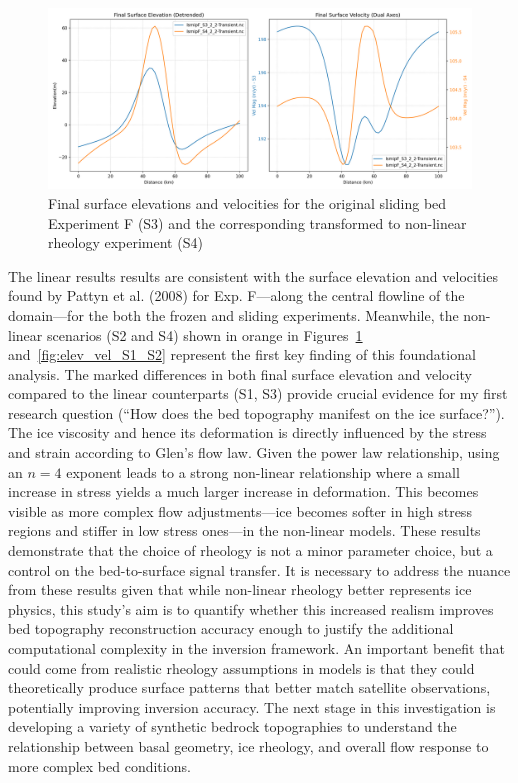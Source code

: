 \begin{figure}[H]
    \includegraphics[scale=0.40]{figures/combined_elevation_detrended_surface_velocity_['S3']_['S4'].png}
    \caption{Final surface elevations and velocities for the original sliding bed Experiment F (S3) and the corresponding transformed to non-linear rheology experiment (S4)}
    \label{fig:elev_vel_S3_S4}
\end{figure}
The linear results results are consistent with the surface elevation and velocities found by Pattyn et al. (2008) for Exp. F—along the central flowline of the domain—for the both the frozen and sliding experiments. Meanwhile, the non-linear scenarios (S2 and S4) shown in orange in Figures~\ref{fig:elev_vel_S3_S4} and~\ref{fig:elev_vel_S1_S2} represent the first key finding of this foundational analysis. The marked differences in both final surface elevation and velocity compared to the linear counterparts (S1, S3) provide crucial evidence for my first research question (``How does the bed topography manifest on the ice surface?''). The ice viscosity and hence its deformation is directly influenced by the stress and strain according to Glen's flow law. Given the power law relationship, using an $n = 4$ exponent leads to a strong non-linear relationship where a small increase in stress yields a much larger increase in deformation. This becomes visible as more complex flow adjustments—ice becomes softer in high stress regions and stiffer in low stress ones—in the non-linear models. These results demonstrate that the choice of rheology is not a minor parameter choice, but a control on the bed-to-surface signal transfer. It is necessary to address the nuance from these results given that while non-linear rheology better represents ice physics, this study's aim is to quantify whether this increased realism improves bed topography reconstruction accuracy enough to justify the additional computational complexity in the inversion framework. An important benefit that could come from realistic rheology assumptions in models is that they could theoretically produce surface patterns that better match satellite observations, potentially improving inversion accuracy.
The next stage in this investigation is developing a variety of synthetic bedrock topographies to understand the relationship between basal geometry, ice rheology, and overall flow response to more complex bed conditions. %

